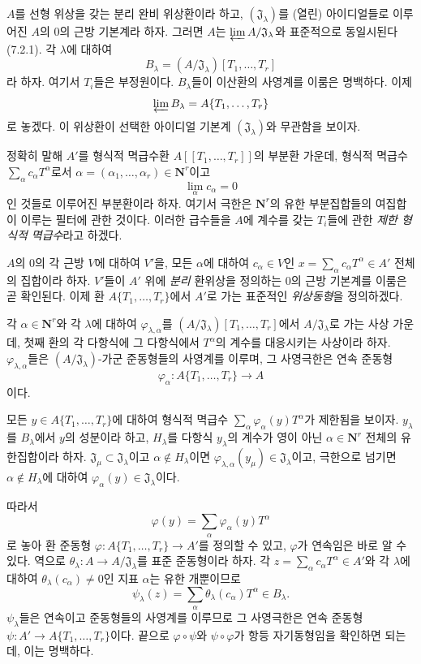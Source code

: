 \begin{env}[7.5.1]
\label{0.7.5.1-ko}
$A$를 선형 위상을 갖는 분리 완비 위상환이라 하고,
$(\mathfrak J_\lambda)$를 (열린) 아이디얼들로 이루어진 $A$의 $0$의
근방 기본계라 하자. 그러면 $A$는
$\varprojlim A/\mathfrak J_\lambda$와 표준적으로 동일시된다
(7.2.1). 각 $\lambda$에 대하여
\[
  B_\lambda=(A/\mathfrak J_\lambda)[T_1,\ldots,T_r]
\]
라 하자. 여기서 $T_i$들은 부정원이다. $B_\lambda$들이 이산환의
사영계를 이룸은 명백하다. 이제
\[
  \varprojlim B_\lambda=A\{T_1,\ldots,T_r\}
\]
로 놓겠다. 이 위상환이 선택한 아이디얼 기본계
$(\mathfrak J_\lambda)$와 무관함을 보이자.

정확히 말해 $A'$를 형식적 멱급수환
$A[\![T_1,\ldots,T_r]\!]$의 부분환 가운데, 형식적 멱급수
$\sum_\alpha c_\alpha T^\alpha$로서
$\alpha=(\alpha_1,\ldots,\alpha_r)\in\mathbf N^r$이고
\[
  \lim_\alpha c_\alpha=0
\]
인 것들로 이루어진 부분환이라 하자. 여기서 극한은 $\mathbf N^r$의
유한 부분집합들의 여집합이 이루는 필터에 관한 것이다. 이러한
급수들을 $A$에 계수를 갖는 $T_i$들에 관한 \emph{제한 형식적
멱급수}라고 하겠다.


$A$의 $0$의 각 근방 $V$에 대하여 $V'$을, 모든 $\alpha$에 대하여
$c_\alpha\in V$인
$x=\sum_\alpha c_\alpha T^\alpha\in A'$ 전체의 집합이라 하자.
$V'$들이 $A'$ 위에 \emph{분리} 환위상을 정의하는 $0$의 근방
기본계를 이룸은 곧 확인된다. 이제 환 $A\{T_1,\ldots,T_r\}$에서
$A'$로 가는 표준적인 \emph{위상동형}을 정의하겠다.

각 $\alpha\in\mathbf N^r$와 각 $\lambda$에 대하여
$\varphi_{\lambda,\alpha}$를
$(A/\mathfrak J_\lambda)[T_1,\ldots,T_r]$에서
$A/\mathfrak J_\lambda$로 가는 사상 가운데, 첫째 환의 각
다항식에 그 다항식에서 $T^\alpha$의 계수를 대응시키는 사상이라
하자. $\varphi_{\lambda,\alpha}$들은
$(A/\mathfrak J_\lambda)$-가군 준동형들의 사영계를 이루며, 그
사영극한은 연속 준동형
\[
  \varphi_\alpha:A\{T_1,\ldots,T_r\}\longrightarrow A
\]
이다.

모든 $y\in A\{T_1,\ldots,T_r\}$에 대하여 형식적 멱급수
$\sum_\alpha\varphi_\alpha(y)T^\alpha$가 제한됨을 보이자.
$y_\lambda$를 $B_\lambda$에서 $y$의 성분이라 하고,
$H_\lambda$를 다항식 $y_\lambda$의 계수가 영이 아닌
$\alpha\in\mathbf N^r$ 전체의 유한집합이라 하자.
$\mathfrak J_\mu\subset\mathfrak J_\lambda$이고
$\alpha\notin H_\lambda$이면
$\varphi_{\lambda,\alpha}(y_\mu)\in\mathfrak J_\lambda$이고, 극한으로
넘기면 $\alpha\notin H_\lambda$에 대하여
$\varphi_\alpha(y)\in\mathfrak J_\lambda$이다.

따라서
\[
  \varphi(y)=\sum_\alpha\varphi_\alpha(y)T^\alpha
\]
로 놓아 환 준동형
$\varphi:A\{T_1,\ldots,T_r\}\to A'$를 정의할 수 있고,
$\varphi$가 연속임은 바로 알 수 있다. 역으로
$\theta_\lambda:A\to A/\mathfrak J_\lambda$를 표준 준동형이라 하자.
각 $z=\sum_\alpha c_\alpha T^\alpha\in A'$와 각 $\lambda$에 대하여
$\theta_\lambda(c_\alpha)\neq0$인 지표 $\alpha$는 유한 개뿐이므로
\[
  \psi_\lambda(z)=
  \sum_\alpha\theta_\lambda(c_\alpha)T^\alpha
  \in B_\lambda.
\]
$\psi_\lambda$들은 연속이고 준동형들의 사영계를 이루므로 그
사영극한은 연속 준동형
$\psi:A'\to A\{T_1,\ldots,T_r\}$이다. 끝으로
$\varphi\circ\psi$와 $\psi\circ\varphi$가 항등 자기동형임을 확인하면
되는데, 이는 명백하다.
\end{env}

